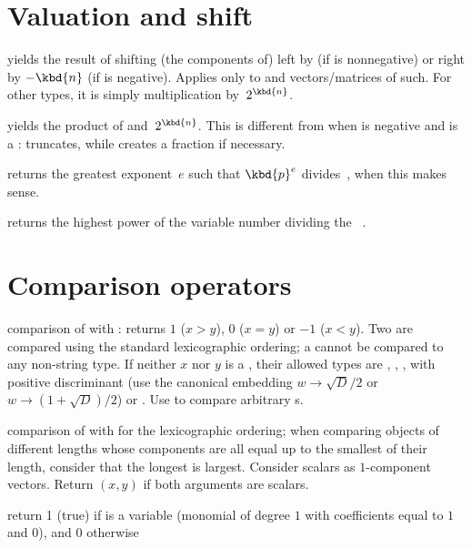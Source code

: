 \section{Valuation and shift}

 yields the result of shifting
(the components of)  left by  (if  is nonnegative)
or right by $-\kbd{n}$ (if  is negative). Applies only to 
and vectors/matrices of such. For other types, it is simply multiplication
by~$2^{\kbd{n}}$.

 yields the product of 
and~$2^{\kbd{n}}$. This is different from  when  is negative
and  is a :  truncates, while 
creates a fraction if necessary.

 returns the greatest exponent~$e$ such that
$\kbd{p}^e$ divides~, when this makes sense.

 returns the highest power of the variable
number  dividing the ~.

\section{Comparison operators}


 comparison of  with : returns
$1$ ($x > y$), $0$ ($x = y$) or $-1$ ($x < y$). Two 
are compared using the standard lexicographic ordering; a 
cannot be compared to any non-string type. If neither
$x$ nor $y$ is a , their allowed types are , ,
,  with positive discriminant (use the canonical
embedding $w \to \sqrt{D}/2$ or $w \to (1 + \sqrt{D})/2$) or .
Use  to compare arbitrary s.

 comparison of  with  for the
lexicographic ordering; when comparing objects of different lengths whose
components are all equal up to the smallest of their length, consider that
the longest is largest. Consider scalars as $1$-component vectors. Return
$(x,y)$ if both arguments are scalars.

 return 1 (true) if  is a variable
(monomial of degree $1$ with  coefficients equal to $1$ and $0$),
and $0$ otherwise

